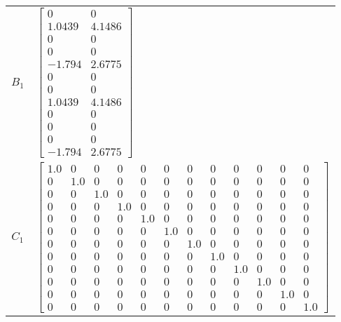 \begin{tabular}{cl}
 $B_{1}$  & $\left[\begin{matrix}0 & 0\\1.0439 & 4.1486\\0 & 0\\0 & 0\\-1.794 & 2.6775\\0 & 0\\0 & 0\\1.0439 & 4.1486\\0 & 0\\0 & 0\\0 & 0\\-1.794 & 2.6775\end{matrix}\right]$                                                                                                                                                                                                                                                                                                                                                                                                                                                                                                                                        \\
 $C_{1}$  & $\left[\begin{array}{cccccccccccc}1.0 & 0 & 0 & 0 & 0 & 0 & 0 & 0 & 0 & 0 & 0 & 0\\0 & 1.0 & 0 & 0 & 0 & 0 & 0 & 0 & 0 & 0 & 0 & 0\\0 & 0 & 1.0 & 0 & 0 & 0 & 0 & 0 & 0 & 0 & 0 & 0\\0 & 0 & 0 & 1.0 & 0 & 0 & 0 & 0 & 0 & 0 & 0 & 0\\0 & 0 & 0 & 0 & 1.0 & 0 & 0 & 0 & 0 & 0 & 0 & 0\\0 & 0 & 0 & 0 & 0 & 1.0 & 0 & 0 & 0 & 0 & 0 & 0\\0 & 0 & 0 & 0 & 0 & 0 & 1.0 & 0 & 0 & 0 & 0 & 0\\0 & 0 & 0 & 0 & 0 & 0 & 0 & 1.0 & 0 & 0 & 0 & 0\\0 & 0 & 0 & 0 & 0 & 0 & 0 & 0 & 1.0 & 0 & 0 & 0\\0 & 0 & 0 & 0 & 0 & 0 & 0 & 0 & 0 & 1.0 & 0 & 0\\0 & 0 & 0 & 0 & 0 & 0 & 0 & 0 & 0 & 0 & 1.0 & 0\\0 & 0 & 0 & 0 & 0 & 0 & 0 & 0 & 0 & 0 & 0 & 1.0\end{array}\right]$                                            \\

\end{tabular}
